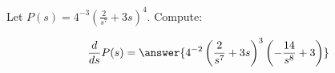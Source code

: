 \documentclass{ximera}
\begin{document}
\begin{exercise}
Let $P(s) =4^{-3}\left(\frac{2}{s^7}+3s \right)^{4}$. Compute:

\[
\dd{s}P(s) =\answer{4^{-2}\left(\frac{2}{s^7}+3s \right)^{3}\left(-\frac{14}{s^8} +3\right)}
\]
\end{exercise}
\end{document}
